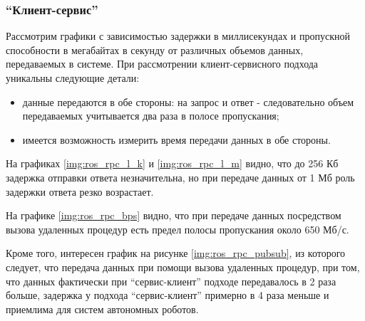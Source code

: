 \subsubsection{\enquote{Клиент-сервис}}
Рассмотрим графики с зависимостью задержки в миллисекундах и пропускной способности в мегабайтах в секунду от различных объемов данных, передаваемых в системе. При рассмотрении клиент-сервисного подхода уникальны следующие детали:
\begin{itemize}[noitemsep]
	\item данные передаются в обе стороны: на запрос и ответ - следовательно объем передаваемых учитывается два раза в полосе пропускания;
	\item имеется возможность измерить время передачи данных в обе стороны.
\end{itemize}

На графиках \ref{img:ros_rpc_l_k} и \ref{img:ros_rpc_l_m} видно, что до 256 Кб задержка отправки ответа незначительна, но при передаче данных от 1 Мб роль задержки ответа резко возрастает.

На графике \ref{img:ros_rpc_bps} видно, что при передаче данных посредством вызова удаленных процедур есть предел полосы пропускания около 650 Мб/с.

Кроме того, интересен график на рисунке \ref{img:ros_rpc_pubsub}, из которого следует, что передача данных при помощи вызова удаленных процедур, при том, что данных фактически при \enquote{сервис-клиент} подходе передавалось в 2 раза больше, задержка у подхода \enquote{сервис-клиент} примерно в 4 раза меньше и приемлима для систем автономных роботов.





